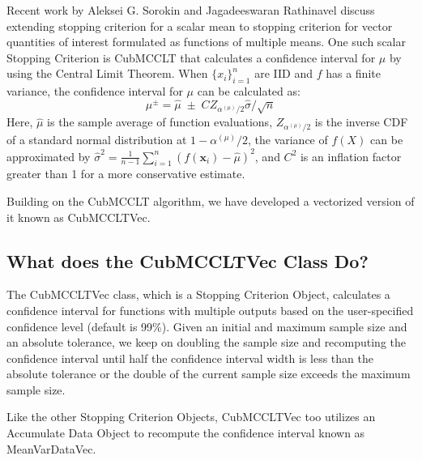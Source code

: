 \setcounter{lstlisting}{0}
\setlength{\parindent}{0pt}

\renewcommand{\lstlistingname}{Example}
\noindent Recent work by Aleksei G. Sorokin and Jagadeeswaran Rathinavel \cite{SorJag23} discuss extending stopping criterion for a scalar mean to stopping criterion for vector quantities of interest formulated as functions of multiple means. One such scalar Stopping Criterion is CubMCCLT that calculates a confidence interval for \(\mu\) by using the Central Limit Theorem. When ${\{x_i\}}_{i=1}^{n}$ are IID and \(f\) has a finite variance, the confidence interval for \(\mu\) can be calculated as:
\begin{equation*}
    \mu^{\pm} = \hat{\mu}\; \pm\; CZ_{{\alpha ^ {(\mu)}/2}} \hat{\sigma}/\sqrt{n}
\end{equation*}
Here, $\hat{\mu}$ is the sample average of function evaluations, $Z_{{\alpha ^ {(\mu)}/2}}$ is the inverse CDF of a standard normal distribution at $1 - {\alpha ^ {(\mu)}/2}$, the variance of \(f(X)\) can be approximated by $\hat{\sigma}^2 = \frac{1}{{n-1}} \sum_{i=1}^{n} (f(\bm{x}_i) - \hat{\mu})^2 $, and $C^2$ is an inflation factor greater than 1 for a more conservative estimate.


\vspace{\baselineskip}  Building on the CubMCCLT algorithm, we have developed a vectorized version of it known as CubMCCLTVec.

\subsection*{What does the CubMCCLTVec Class Do?}
The CubMCCLTVec class, which is a Stopping Criterion Object, calculates a confidence interval for functions with multiple outputs based on the user-specified confidence level (default is 99\%). Given an initial and maximum sample size and an absolute tolerance, we keep on doubling the sample size and recomputing the confidence interval until half the confidence interval width is less than the absolute tolerance or the double of the current sample size exceeds the maximum sample size.


\vspace{\baselineskip}  Like the other Stopping Criterion Objects, CubMCCLTVec too utilizes an Accumulate Data Object to recompute the confidence interval known as MeanVarDataVec.
